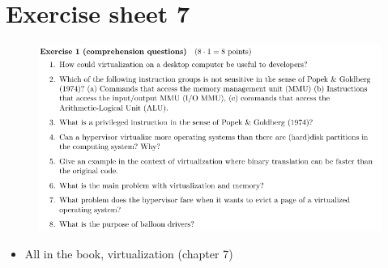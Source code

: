 \documentclass[10pt]{beamer}
\begin{document}
    
\section*{Exercise sheet 7}
\frame{\sectionpage}
\begin{frame}{}
 \begin{figure}
           \includegraphics[keepaspectratio, width=\textwidth, height=\textheight-2\baselineskip-2\baselineskip]{img/ex6_100.png} \\
        \end{figure}
        \begin{itemize}
         \item All in the book, virtualization (chapter 7)
        \end{itemize}
        \framebreak
        

\end{frame}
\end{document}
